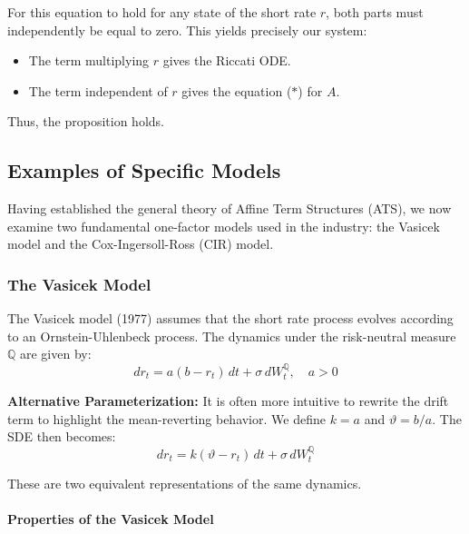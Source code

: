 \documentclass[12pt,a4paper]{article}
\theoremstyle{definition}
\newcommand{\Q}{\mathbb{Q}}
\begin{document}
For this equation to hold for any state of the short rate $r$, both parts must independently be equal to zero. This yields precisely our system:

\begin{itemize}
\item The term multiplying $r$ gives the Riccati ODE.
\item The term independent of $r$ gives the equation ($*$) for $A$.
\end{itemize}

Thus, the proposition holds.

\subsection{Examples of Specific Models}

Having established the general theory of Affine Term Structures (ATS), we now examine two fundamental one-factor models used in the industry: the Vasicek model and the Cox-Ingersoll-Ross (CIR) model.

\subsubsection{The Vasicek Model}

The Vasicek model (1977) assumes that the short rate process evolves according to an Ornstein-Uhlenbeck process. The dynamics under the risk-neutral measure $\Q$ are given by:
\[
dr_t = a(b - r_t)\,dt + \sigma\,dW_t^{\Q}, \quad a > 0
\]

\textbf{Alternative Parameterization:} It is often more intuitive to rewrite the drift term to highlight the mean-reverting behavior. We define $k = a$ and $\vartheta = b/a$. The SDE then becomes:
\[
dr_t = k(\vartheta - r_t)\,dt + \sigma\,dW_t^{\Q}
\]

These are two equivalent representations of the same dynamics.

\paragraph{Properties of the Vasicek Model}
\end{document}
